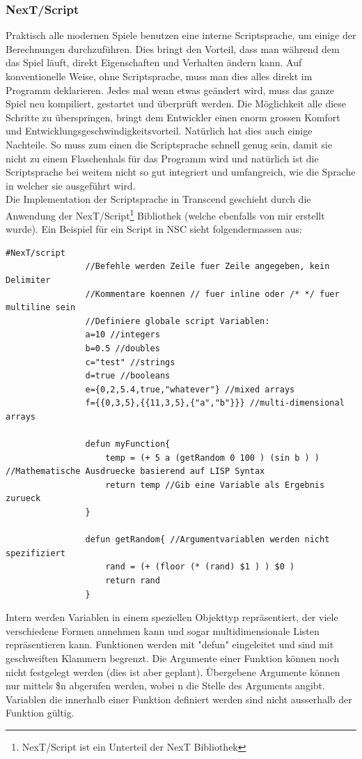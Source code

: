 \documentclass[12pt,a4paper,titlepage]{article}
\begin{document}
		\subsubsection{NexT/Script}
			Praktisch alle modernen Spiele benutzen eine interne Scriptsprache, um einige der Berechnungen durchzuführen. Dies bringt den Vorteil, dass man während dem das Spiel läuft, direkt Eigenschaften und Verhalten ändern kann. Auf konventionelle Weise, ohne Scriptsprache, muss man dies alles direkt im Programm deklarieren. Jedes mal wenn etwas geändert wird, muss das ganze Spiel neu kompiliert, gestartet und überprüft werden. Die Möglichkeit alle diese Schritte zu überspringen, bringt dem Entwickler einen enorm grossen Komfort und Entwicklungsgeschwindigkeitsvorteil. Natürlich hat dies auch einige Nachteile. So muss zum einen die Scriptsprache schnell genug sein, damit sie nicht zu einem Flaschenhals für das Programm wird und natürlich ist die Scriptsprache bei weitem nicht so gut integriert und umfangreich, wie die Sprache in welcher sie ausgeführt wird.\\
			
			Die Implementation der Scriptsprache in Transcend geschieht durch die Anwendung der NexT/Script\footnote{NexT/Script ist ein Unterteil der NexT Bibliothek} Bibliothek (welche ebenfalls von mir erstellt wurde). Ein Beispiel für ein Script in NSC sieht folgendermassen aus:
			\begin{lstlisting}[label=NSCEX1,caption=NexT/Script Beispiel]
				#NexT/script 
				//Befehle werden Zeile fuer Zeile angegeben, kein Delimiter
				//Kommentare koennen // fuer inline oder /* */ fuer multiline sein
				//Definiere globale script Variablen:
				a=10 //integers
				b=0.5 //doubles
				c="test" //strings
				d=true //booleans
				e={0,2,5.4,true,"whatever"} //mixed arrays
				f={{0,3,5},{{11,3,5},{"a","b"}}} //multi-dimensional arrays

				defun myFunction{ 
					temp = (+ 5 a (getRandom 0 100 ) (sin b ) ) //Mathematische Ausdruecke basierend auf LISP Syntax
					return temp //Gib eine Variable als Ergebnis zurueck
				} 

				defun getRandom{ //Argumentvariablen werden nicht spezifiziert
					rand = (+ (floor (* (rand) $1 ) ) $0 ) 
					return rand
				}
			\end{lstlisting}
			Intern werden Variablen in einem speziellen Objekttyp repräsentiert, der viele verschiedene Formen annehmen kann und sogar multidimensionale Listen repräsentieren kann. Funktionen werden mit "defun" eingeleitet und sind mit geschweiften Klammern begrenzt. Die Argumente einer Funktion können noch nicht festgelegt werden (dies ist aber geplant). Übergebene Argumente können nur mittels \$n abgerufen werden, wobei n die Stelle des Arguments angibt. Variablen die innerhalb einer Funktion definiert werden sind nicht ausserhalb der Funktion gültig.\\
			
\end{document}
